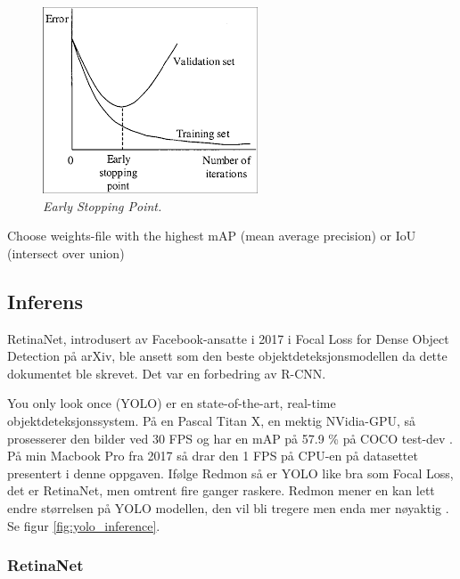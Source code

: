 \begin{figure}[h!]
\begin{center} 
\includegraphics[scale=1.0]{figures/early_stopping_point}
\caption{\small \sl Early Stopping Point. \label{fig:early_stopping_point}}
\end{center}
\end{figure}

Choose weights-file with the highest mAP (mean average precision) or IoU (intersect over union)


\subsection{Inferens}

RetinaNet, introdusert av Facebook-ansatte i 2017 i Focal Loss for Dense Object Detection på arXiv, ble ansett som den beste objektdeteksjonsmodellen da dette dokumentet ble skrevet. Det var en forbedring av R-CNN. \cite{Lin m.fl. 2017}

You only look once (YOLO) er en state-of-the-art, real-time objektdeteksjonssystem. På en Pascal Titan X, en mektig NVidia-GPU, så prosesserer den bilder ved 30 FPS og har en mAP på 57.9 \% på COCO test-dev \cite{Redmon 2018}. På min Macbook Pro fra 2017 så drar den 1 FPS på CPU-en på datasettet presentert i denne oppgaven. Ifølge Redmon så er YOLO like bra som Focal Loss, det er RetinaNet, men omtrent fire ganger raskere. Redmon mener en kan lett endre størrelsen på YOLO modellen, den vil bli tregere men enda mer nøyaktig \cite{Redmon 2016}. Se figur \ref{fig:yolo_inference}. %

\subsubsection{RetinaNet}


